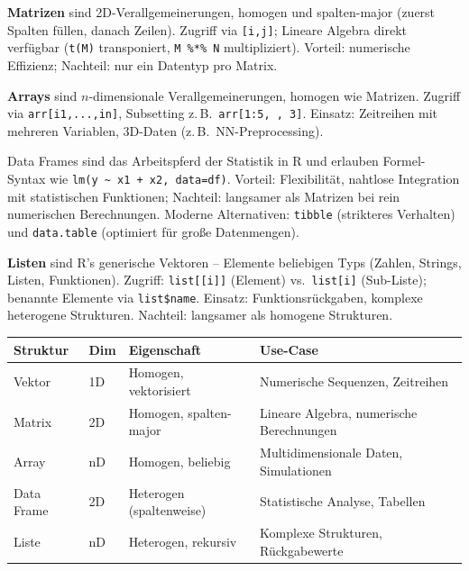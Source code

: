 \textbf{Matrizen} sind 2D-Verallgemeinerungen, homogen und spalten-major (zuerst Spalten füllen, danach Zeilen). Zugriff via \texttt{[i,j]}; Lineare Algebra direkt verfügbar (\texttt{t(M)} transponiert, \texttt{M \%*\% N} multipliziert). Vorteil: numerische Effizienz; Nachteil: nur ein Datentyp pro Matrix.

\textbf{Arrays} sind $n$-dimensionale Verallgemeinerungen, homogen wie Matrizen. Zugriff via \texttt{arr[i1,\allowbreak ...,in]}, Subsetting z.\,B.\ \texttt{arr[1:5, , 3]}. Einsatz: Zeitreihen mit mehreren Variablen, 3D-Daten (z.\,B.\ NN-Preprocessing).


Data Frames sind das Arbeitspferd der Statistik in R und erlauben Formel-Syntax wie \texttt{lm(y \textasciitilde\ x1 + x2, data=df)}. Vorteil: Flexibilität, nahtlose Integration mit statistischen Funktionen; Nachteil: langsamer als Matrizen bei rein numerischen Berechnungen. Moderne Alternativen: \texttt{tibble} (strikteres Verhalten) und \texttt{data.table} (optimiert für große Datenmengen).

\textbf{Listen} sind R's generische Vektoren -- Elemente beliebigen Typs (Zahlen, Strings, Listen, Funktionen). Zugriff: \texttt{list[[i]]} (Element) vs.\ \texttt{list[i]} (Sub-Liste); benannte Elemente via \texttt{list\$\allowbreak name}. Einsatz: Funktionsrückgaben, komplexe heterogene Strukturen. Nachteil: langsamer als homogene Strukturen.

\begin{table}[H]
  \centering
  \begin{tabularx}{\linewidth}{L{1.5cm} C{1.0cm} L{4.5cm} L{6.0cm}}
    \textbf{Struktur} & \textbf{Dim} & \textbf{Eigenschaft}     & \textbf{Use-Case}                        \\
    \midrule
    Vektor            & 1D           & Homogen, vektorisiert    & Numerische Sequenzen, Zeitreihen         \\
    Matrix            & 2D           & Homogen, spalten-major   & Lineare Algebra, numerische Berechnungen \\
    Array             & nD           & Homogen, beliebig        & Multidimensionale Daten, Simulationen    \\
    Data Frame        & 2D           & Heterogen (spaltenweise) & Statistische Analyse, Tabellen           \\
    Liste             & nD           & Heterogen, rekursiv      & Komplexe Strukturen, Rückgabewerte       \\
  \end{tabularx}
\end{table}

